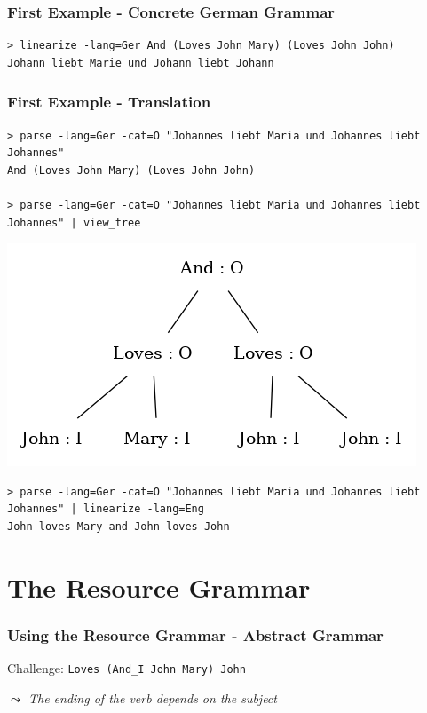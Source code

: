 \documentclass{beamer}
\begin{document}
\begin{frame}[fragile]
    \frametitle{First Example - Concrete German Grammar}

    

    \vspace{2em}
\begin{lstlisting}[language=GFcmd, breaklines=true]
> linearize -lang=Ger And (Loves John Mary) (Loves John John)
Johann liebt Marie und Johann liebt Johann
\end{lstlisting}
\end{frame}

\begin{frame}[fragile]
    \frametitle{First Example - Translation}
\begin{lstlisting}[language=GFcmd, breaklines=true]
> parse -lang=Ger -cat=O "Johannes liebt Maria und Johannes liebt Johannes"
And (Loves John Mary) (Loves John John)

> parse -lang=Ger -cat=O "Johannes liebt Maria und Johannes liebt Johannes" | view_tree
\end{lstlisting}
    \includegraphics[scale=0.3]{graph_1.png}
\begin{lstlisting}[language=GFcmd, breaklines=true]
> parse -lang=Ger -cat=O "Johannes liebt Maria und Johannes liebt Johannes" | linearize -lang=Eng
John loves Mary and John loves John
\end{lstlisting}
\end{frame}

\section{The Resource Grammar}

\begin{frame}[fragile]
    \frametitle{Using the Resource Grammar - Abstract Grammar}

    

    \vspace{2em}
    Challenge: \lstinline[language=GFcmd]{Loves (And_I John Mary) John}
    
    \vspace{1em}
    \emph{$\leadsto$ The ending of the verb depends on the subject}
\end{frame}
\end{document}
